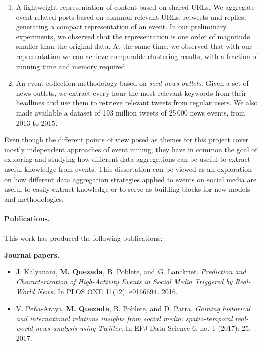 \begin{intro}
\begin{enumerate}
\item A lightweight representation of content based on shared URLs.
%
We aggregate event-related posts based on common relevant URLs, retweets and
replies, generating a compact representation of an event.
%
In our preliminary experiments, we observed that the representation is one order
of magnitude smaller than the original data.
%
At the same time, we observed that with our representation we can achieve
comparable clustering results, with a fraction of running time and memory
required.

\item An event collection methodology based on {\em seed news outlets}.
%
Given a set of news outlets, we extract every hour the most relevant keywords
from their headlines and use them to retrieve relevant tweets from regular
users.
%
We also made available a dataset of 193 million tweets of 25\,000 news events,
from 2013 to 2015.
\end{enumerate}

Even though the different points of view posed as themes for this project cover
mostly independent approaches of event mining, they have in common the goal of
exploring and studying how different data aggregations can be useful to extract
useful knowledge from events. 
%
This dissertation can be viewed as an exploration on how different data
aggregation strategies applied to events on social media are useful to easily
extract knowledge or to serve as building blocks for new models and
methodologies.




\paragraph{Publications.} This work has produced the following publications:

{\bf Journal papers.}
\begin{itemize}
    \item J. Kalyanam, {\bf M. Quezada}, B. Poblete, and G. Lanckriet. {\em
     Prediction and Characterization of High-Activity Events in Social Media
     Triggered by Real-World News}. In PLOS ONE 11(12): e0166694. 2016.

    \item V. Peña-Araya, {\bf M. Quezada}, B. Poblete, and D. Parra. {\em
    Gaining historical and international relations insights from social media:
    spatio-temporal real-world news analysis using Twitter.} In EPJ Data Science
    6, no. 1 (2017): 25. 2017.
\end{itemize}


\end{intro}
